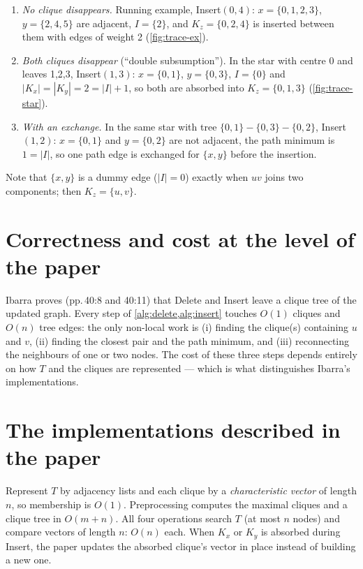 \documentclass[11pt,a4paper,oneside]{report}
\theoremstyle{plain}
\theoremstyle{definition}
\theoremstyle{remark}
\newcommand{\op}[1]{\textsf{#1}}
\begin{document}
\begin{example}
\begin{enumerate}
\item \emph{No clique disappears.} Running example, \op{Insert}\((0,4)\): \(x=\{0,1,2,3\}\),
  \(y=\{2,4,5\}\) are adjacent, \(I=\{2\}\), and \(K_z=\{0,2,4\}\) is inserted between them with
  edges of weight 2 (\cref{fig:trace-ex}).
\item \emph{Both cliques disappear} (``double subsumption''). In the star with centre 0 and
  leaves 1,2,3, \op{Insert}\((1,3)\): \(x=\{0,1\}\), \(y=\{0,3\}\), \(I=\{0\}\) and
  \(|K_x|=|K_y|=2=|I|+1\), so both are absorbed into \(K_z=\{0,1,3\}\) (\cref{fig:trace-star}).
\item \emph{With an exchange.} In the same star with tree \(\{0,1\}\!-\!\{0,3\}\!-\!\{0,2\}\),
  \op{Insert}\((1,2)\): \(x=\{0,1\}\) and \(y=\{0,2\}\) are not adjacent, the path minimum is
  \(1=|I|\), so one path edge is exchanged for \(\{x,y\}\) before the insertion.
\end{enumerate}
\end{example}

Note that \(\{x,y\}\) is a dummy edge (\(|I|=0\)) exactly when \(uv\) joins two components; then
\(K_z=\{u,v\}\).

\section{Correctness and cost at the level of the paper}
Ibarra proves (pp.\,40:8 and 40:11) that \op{Delete} and \op{Insert} leave a clique tree of the
updated graph. Every step of \cref{alg:delete,alg:insert} touches \(O(1)\) cliques and \(O(n)\)
tree edges: the only non-local work is (i) finding the clique(s) containing \(u\) and \(v\),
(ii) finding the closest pair and the path minimum, and (iii) reconnecting the neighbours of one
or two nodes. The cost of these three steps depends entirely on how \(T\) and the cliques are
represented --- which is what distinguishes Ibarra's implementations.

\section{The implementations described in the paper}\label{sec:paper-implementations}
\begin{paperbox}
Represent \(T\) by adjacency lists and each clique by a \emph{characteristic vector} of length
\(n\), so membership is \(O(1)\). Preprocessing computes the maximal cliques and a clique tree
in \(O(m+n)\). All four operations search \(T\) (at most \(n\) nodes) and compare vectors of
length \(n\): \(O(n)\) each. When \(K_x\) or \(K_y\) is absorbed during \op{Insert}, the paper
updates the absorbed clique's vector in place instead of building a new one.
\end{paperbox}
\end{document}
